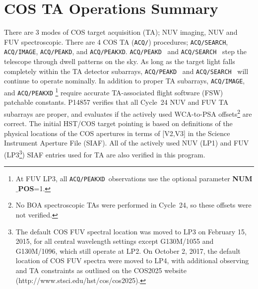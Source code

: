 \documentclass{stsci_report}
\newcommand{\tacq}[1]{\texttt{ACQ/#1}}
\begin{document}
\section{COS TA Operations Summary}\label{sec:TAoperations}
There are 3 modes of COS target acquisition (TA); NUV imaging, NUV and FUV spectroscopic.
There are 4 COS TA (\tacq{}) procedures; \tacq{SEARCH}, \tacq{IMAGE}, \tacq{PEAKD}, and \tacq{PEAKXD}. \tacq{PEAKD}~ and \tacq{SEARCH}~ step the telescope through dwell patterns on the sky. As long as the target light falls completely within
the TA detector subarrays, \tacq{PEAKD}~ and \tacq{SEARCH}~ will continue to operate nominally.
In addition to proper TA subarrays, \tacq{IMAGE}, and \tacq{PEAKXD} \footnote{At FUV LP3, all \tacq{PEAKXD}~observations use the optional parameter {{\bf NUM$\_$POS}\rm}=1.} require accurate TA-associated flight software (FSW) patchable constants.
P14857 verifies that all Cycle~24 NUV and FUV TA subarrays are proper, and evaluates if the actively used WCA-to-PSA offsets\footnote{No BOA spectroscopic TAs were performed in Cycle~24, so these offsets were not verified.} are correct.
The initial HST/COS target pointing is based on definitions of the physical locations of the COS apertures in terms of [V2,V3] in the Science Instrument Aperture File (SIAF).
All of the actively used NUV (LP1) and FUV (LP3\footnote{The default COS FUV spectral location was moved to LP3 on February 15, 2015, for all central wavelength settings except G130M/1055 and G130M/1096, which still operate at LP2. On October 2, 2017, the default location of COS FUV spectra were moved to LP4, with additional observing and TA constraints as outlined on the COS2025 website (http://www.stsci.edu/hst/cos/cos2025).}) SIAF entries used for TA are also verified in this program.
\end{document}
